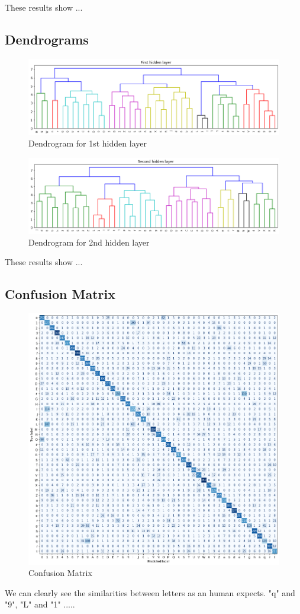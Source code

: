 \documentclass[a4paper, 11pt]{article}
\begin{document}
			These results show ...
		
		\subsection{Dendrograms}
		
			\begin{figure}[H]
				\centering
				\includegraphics[width=.99\linewidth]{dend1.png}  
				\caption{Dendrogram for 1st hidden layer}
				\label{fig:dend1}
			\end{figure}
		
			\begin{figure}[H]
				\centering
				\includegraphics[width=.99\linewidth]{dend2.png}  
				\caption{Dendrogram for 2nd hidden layer}
				\label{fig:dend2}
			\end{figure}
		
			These results show ...
		
		
		
		
		
		\subsection{Confusion Matrix}	
			\begin{figure}[H]
				\centering
				\includegraphics[width=.7\linewidth]{confmatBlue2.png}    %
				\caption{Confusion Matrix}
				\label{fig:confmat}
			\end{figure}
			We can clearly see the similarities between letters as an human expects.
			"q" and "9", "L" and "1" .....
			
\end{document}
